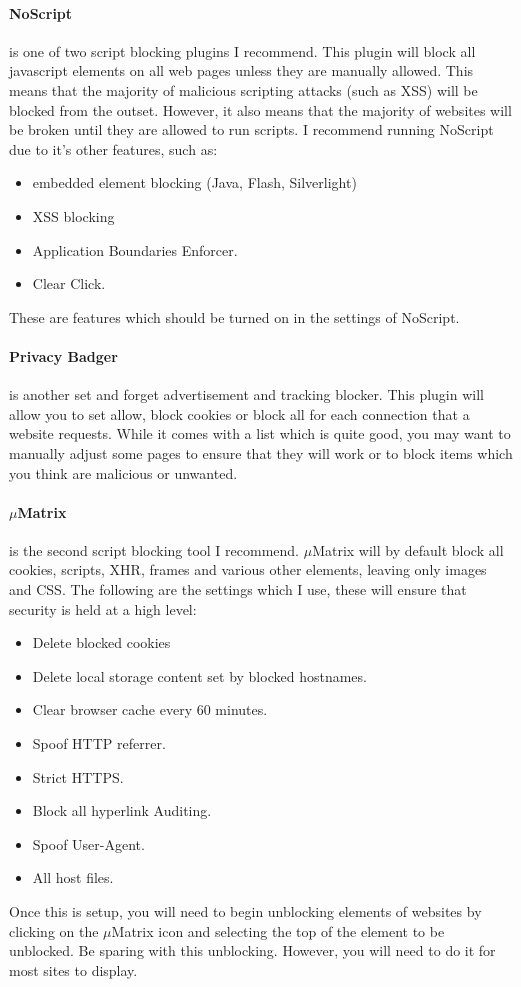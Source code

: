 \documentclass[a4paper,11pt,draft]{article}
\begin{document}
		\paragraph{NoScript}
			is one of two script blocking plugins I recommend. 
			This plugin will block all javascript elements on all web pages unless they are manually allowed. 
			This means that the majority of malicious scripting attacks (such as XSS) will be blocked from the outset. 
			However, it also means that the majority of websites will be broken until they are allowed to run scripts. 
			I recommend running NoScript due to it's other features, such as:
			\begin{itemize}
				\item embedded element blocking (Java, Flash, Silverlight) 
				\item XSS blocking
				\item Application Boundaries Enforcer. 
				\item Clear Click. 
			\end{itemize}
			These are features which should be turned on in the settings of NoScript. 
		\paragraph{Privacy Badger}
			is another set and forget advertisement and tracking blocker. 
			This plugin will allow you to set allow, block cookies or block all for each connection that a website requests. 
			While it comes with a list which is quite good, you may want to manually adjust some pages to ensure that they will work or to block items which you think are malicious or unwanted. 
		\paragraph{$\mu{}$Matrix}
			is the second script blocking tool I recommend. 
			$\mu{}$Matrix will by default block all cookies, scripts, XHR, frames and various other elements, leaving only images and CSS. 
			The following are the settings which I use, these will ensure that security is held at a high level:
			\begin{itemize}
				\item Delete blocked cookies
				\item Delete local storage content set by blocked hostnames. 
				\item Clear browser cache every 60 minutes. 
				\item Spoof HTTP referrer. 
				\item Strict HTTPS.
				\item Block all hyperlink Auditing. 
				\item Spoof User-Agent. 
				\item All host files. 
			\end{itemize}
			Once this is setup, you will need to begin unblocking elements of websites by clicking on the $\mu{}$Matrix icon and selecting the top of the element to be unblocked. 
			Be sparing with this unblocking. However, you will need to do it for most sites to display. 
\end{document}
